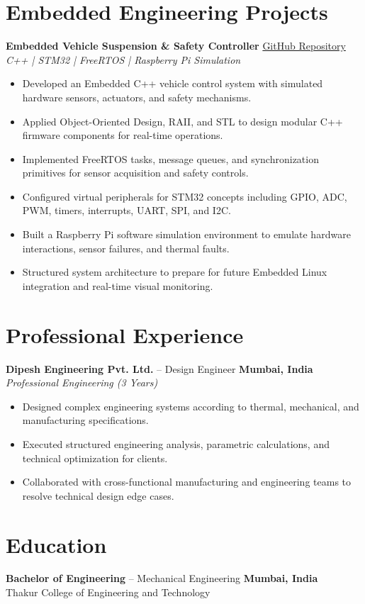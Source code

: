 \documentclass[10pt,letterpaper]{article}
\begin{document}
\vspace{-2mm}

\section*{Embedded Engineering Projects}
\textbf{Embedded Vehicle Suspension \& Safety Controller} \hfill \href{https://github.com/ashu304-ops/project1}{GitHub Repository}\\
\textit{C++ | STM32 | FreeRTOS | Raspberry Pi Simulation}
\begin{itemize}[leftmargin=*, itemsep=2pt, parsep=0pt]
    \item Developed an Embedded C++ vehicle control system with simulated hardware sensors, actuators, and safety mechanisms.
    \item Applied Object-Oriented Design, RAII, and STL to design modular C++ firmware components for real-time operations.
    \item Implemented FreeRTOS tasks, message queues, and synchronization primitives for sensor acquisition and safety controls.
    \item Configured virtual peripherals for STM32 concepts including GPIO, ADC, PWM, timers, interrupts, UART, SPI, and I2C.
    \item Built a Raspberry Pi software simulation environment to emulate hardware interactions, sensor failures, and thermal faults.
    \item Structured system architecture to prepare for future Embedded Linux integration and real-time visual monitoring.
\end{itemize}

\vspace{-2mm}

\section*{Professional Experience}
\textbf{Dipesh Engineering Pvt. Ltd.} -- Design Engineer \hfill \textbf{Mumbai, India}\\
\textit{Professional Engineering (3 Years)}
\begin{itemize}[leftmargin=*, itemsep=2pt, parsep=0pt]
    \item Designed complex engineering systems according to thermal, mechanical, and manufacturing specifications.
    \item Executed structured engineering analysis, parametric calculations, and technical optimization for clients.
    \item Collaborated with cross-functional manufacturing and engineering teams to resolve technical design edge cases.
\end{itemize}

\vspace{-2mm}

\section*{Education}
\textbf{Bachelor of Engineering} -- Mechanical Engineering \hfill \textbf{Mumbai, India}\\
Thakur College of Engineering and Technology
\end{document}
